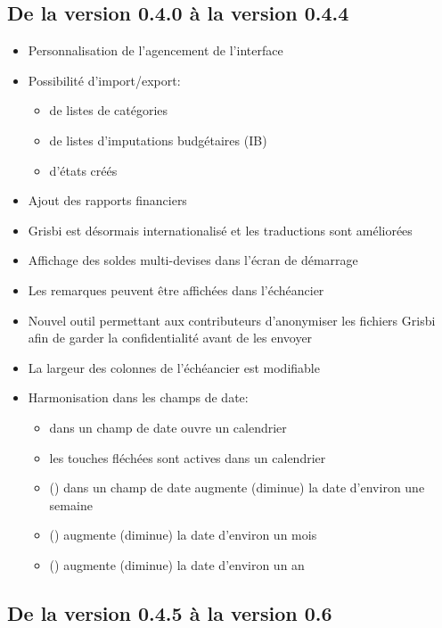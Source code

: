 
\subsection{De la version 0.4.0 à la version 0.4.4}

\begin{itemize}
	\item Personnalisation de l'agencement de l'interface
	\item Possibilité d'import/export:
		\begin{itemize}
		\item de listes de catégories
		\item de listes d'imputations budgétaires (IB)
		\item d'états créés
		\end{itemize}	
	\item Ajout des rapports financiers
	\item Grisbi est désormais internationalisé et les traductions sont améliorées
	\item Affichage des soldes multi-devises dans l'écran de démarrage
	\item Les remarques peuvent être affichées dans l'échéancier
	\item Nouvel outil permettant aux contributeurs d'anonymiser les fichiers Grisbi afin de garder la confidentialité avant de les envoyer
	\item La largeur des colonnes de l'échéancier est modifiable
	\item Harmonisation dans les champs de date:
		\begin{itemize}
		\item {} dans un champ de date ouvre un calendrier
		\item les touches fléchées sont actives dans un calendrier
		\item {}\key{+} (\key{-}) dans un champ de date augmente (diminue) la date d'environ une semaine
		\item {} () augmente (diminue) la date d'environ un mois
		\item {} () augmente (diminue) la date d'environ un an
		\end{itemize}	
\end{itemize}

\subsection{De la version 0.4.5 à la version 0.6}

